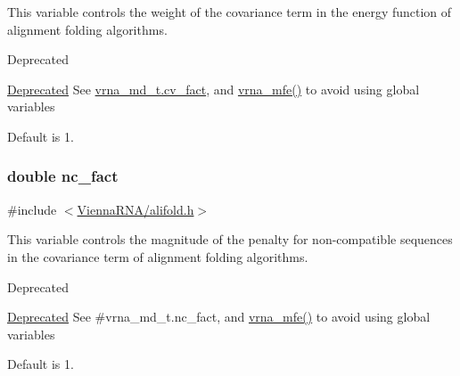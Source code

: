 This variable controls the weight of the covariance term in the energy function of alignment folding algorithms. 

\begin{DoxyRefDesc}{Deprecated}
\item[\hyperlink{deprecated__deprecated000016}{Deprecated}]See \hyperlink{group__model__details_a62ebefb9d0643e5c4c8a2ec84a105ce6}{vrna\-\_\-md\-\_\-t.\-cv\-\_\-fact}, and \hyperlink{group__mfe__fold_gabd3b147371ccf25c577f88bbbaf159fd}{vrna\-\_\-mfe()} to avoid using global variables\end{DoxyRefDesc}


Default is 1. \hypertarget{group__consensus__fold_ga502948a122a2af5b914355b1f3ea2f61}{
\subsubsection[{nc\-\_\-fact}]{\setlength{\rightskip}{0pt plus 5cm}double nc\-\_\-fact}}\label{group__consensus__fold_ga502948a122a2af5b914355b1f3ea2f61}


{\ttfamily \#include $<$\hyperlink{alifold_8h}{Vienna\-R\-N\-A/alifold.\-h}$>$}



This variable controls the magnitude of the penalty for non-\/compatible sequences in the covariance term of alignment folding algorithms. 

\begin{DoxyRefDesc}{Deprecated}
\item[\hyperlink{deprecated__deprecated000017}{Deprecated}]See \#vrna\-\_\-md\-\_\-t.\-nc\-\_\-fact, and \hyperlink{group__mfe__fold_gabd3b147371ccf25c577f88bbbaf159fd}{vrna\-\_\-mfe()} to avoid using global variables\end{DoxyRefDesc}


Default is 1. 